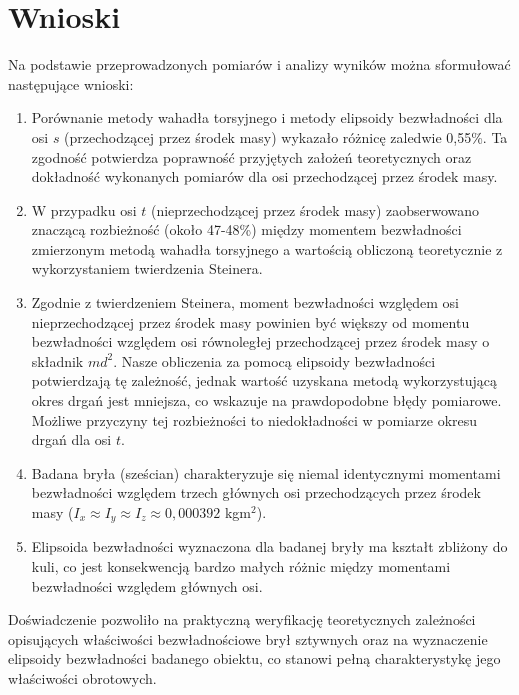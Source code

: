 \documentclass[a4paper,12pt]{article}
\begin{document}
\section{Wnioski}


Na podstawie przeprowadzonych pomiarów i analizy wyników można sformułować następujące wnioski:

\begin{enumerate}
    \item Porównanie metody wahadła torsyjnego i metody elipsoidy bezwładności dla osi $s$ (przechodzącej przez środek masy) wykazało różnicę zaledwie 0,55\%. Ta zgodność potwierdza poprawność przyjętych założeń teoretycznych oraz dokładność wykonanych pomiarów dla osi przechodzącej przez środek masy.

    \item W przypadku osi $t$ (nieprzechodzącej przez środek masy) zaobserwowano znaczącą rozbieżność (około 47-48\%) między momentem bezwładności zmierzonym metodą wahadła torsyjnego a wartością obliczoną teoretycznie z wykorzystaniem twierdzenia Steinera.

    \item Zgodnie z twierdzeniem Steinera, moment bezwładności względem osi nieprzechodzącej przez środek masy powinien być większy od momentu bezwładności względem osi równoległej przechodzącej przez środek masy o składnik $md^2$. Nasze obliczenia za pomocą elipsoidy bezwładności potwierdzają tę zależność, jednak wartość uzyskana metodą wykorzystującą okres drgań jest mniejsza, co wskazuje na prawdopodobne błędy pomiarowe. Możliwe przyczyny tej rozbieżności to niedokładności w pomiarze okresu drgań dla osi $t$.

    \item Badana bryła (sześcian) charakteryzuje się niemal identycznymi momentami bezwładności względem trzech głównych osi przechodzących przez środek masy ($I_x \approx I_y \approx I_z \approx 0,000392$ kgm$^2$).

    \item Elipsoida bezwładności wyznaczona dla badanej bryły ma kształt zbliżony do kuli, co jest konsekwencją bardzo małych różnic między momentami bezwładności względem głównych osi.

\end{enumerate}

Doświadczenie pozwoliło na praktyczną weryfikację teoretycznych zależności opisujących właściwości bezwładnościowe brył sztywnych oraz na wyznaczenie elipsoidy bezwładności badanego obiektu, co stanowi pełną charakterystykę jego właściwości obrotowych.



\end{document}
